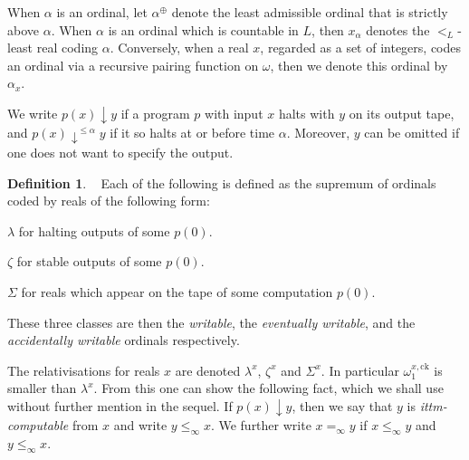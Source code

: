 \documentclass[a4paper,11pt]{amsart}
\theoremstyle{definition}
\newcommand{\ck}{\mathrm{ck}}
\newcommand{\dfs}{=_{\mathrm{def}}}
\newtheorem{definition}[fact]{Definition}
\newtheorem*{problem A}{Problem 1}
\newtheorem*{problem B}{Problem 2}
\theoremstyle{remark}
\newenvironment{enumerate-(a)}{\begin{enumerate}[label={\upshape (\alph*)}, leftmargin=2pc]}{\end{enumerate}}
\def\mb{\mbox{ }}
\begin{document}
When $\alpha$ is an ordinal, let $\alpha^\oplus$ denote the least admissible ordinal that is strictly above $\alpha$. When $\alpha$ is an ordinal which is countable in $L$, then $x_\alpha$ denotes the $<_{L}$-least real coding $\alpha$. 
Conversely, when a real  $x$, regarded as a set of integers, codes an ordinal via a recursive pairing function on $\omega$, then we denote this ordinal by $\alpha_x$. 

We write $p(x){\downarrow}y$ if a program $p$ with input $x$ halts with $y$ on its output tape, and $p(x){\downarrow}^{\leq\alpha}y$ if it  so halts at or before time $\alpha$. 
Moreover, $y$ can be omitted if one does not want to specify the output. 

\begin{definition} \ %
Each of the following is defined as the supremum of ordinals coded by reals of the following form: 
\begin{enumerate-(a)} 
\item 
$\lambda$ for halting outputs of some $p(0)$. 
\item 
$\zeta$ for stable outputs of some $p(0)$. 
\item 
$\Sigma$ for reals which appear on the tape of some computation $p(0)$. 
\end{enumerate-(a)} 
\end{definition}

These three classes are then the \emph{writable}, the \emph{eventually writable}, and the \emph{accidentally writable} ordinals respectively. 


The relativisations for reals $x$ are denoted $\lambda^x$, $\zeta^x$ and $\Sigma^x$.  
In particular $\omega_{1}^{x,\ck}$ is smaller than $\lambda^{x}$. 
From this one can show the following fact, which we shall use without further mention in the sequel. 
If  $p(x){\downarrow}y$, then we say that $y$ is {\em ittm-computable} from $x$ and write $y\leq_{\infty}x$. We further write $x=_{\infty}y$ if $x\leq
_{\infty} y $ and $ y\leq_{\infty} x$. 
\end{document}
